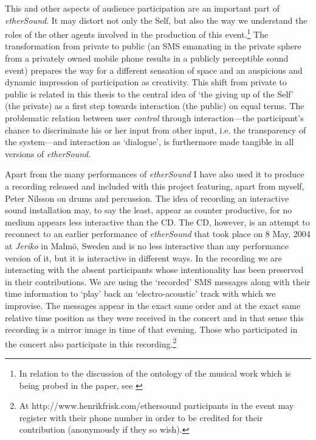 This and other aspects of audience participation are an important part of \emph{etherSound}. It may distort not only the Self, but also the way we understand the roles of the other agents involved in the production of this event.\footnote{In relation to the discussion of the ontology of the musical work which is being probed in the paper, see \cite{frisk-ost06-2}} The transformation from private to public (an SMS emanating in the private sphere from a privately owned mobile phone results in a publicly perceptible sound event) prepares the way for a different sensation of space and an auspicious and dynamic impression of participation as creativity. This shift from private to public is related in this thesis to the central idea of `the giving up of the Self' (the private) as a first step towards interaction (the public) on equal terms. The problematic relation between user \emph{control} through interaction---the participant's chance to discriminate his or her input from other input, i.e. the transparency of the system---and interaction as `dialogue', is furthermore made tangible in all versions of \emph{etherSound}.

Apart from the many performances of \emph{etherSound} I have also used it to produce a recording released and included with this project featuring, apart from myself, Peter Nilsson on drums and percussion. The idea of recording an interactive sound installation may, to say the least, appear as counter productive, for no medium appears less interactive than the CD. The CD, however, is an attempt to reconnect to an earlier performance of \emph{etherSound} that took place on 8 May, 2004 at \emph{Jeriko} in Malm\"{o}, Sweden and is no less interactive than any performance version of it, but it is interactive in different ways. In the recording we are interacting with the absent participants whose intentionality has been preserved in their contributions. We are using the `recorded' SMS messages along with their time information to `play' back an `electro-acoustic' track with which we improvise. The messages appear in the exact same order and at the exact same relative time position as they were received in the concert and in that sense this recording is a mirror image in time of that evening. Those who participated in the concert also participate in this recording.\footnote{At http://www.henrikfrisk.com/ethersound participants in the event may register with their phone number in order to be credited for their contribution (anonymously if they so wish).}

